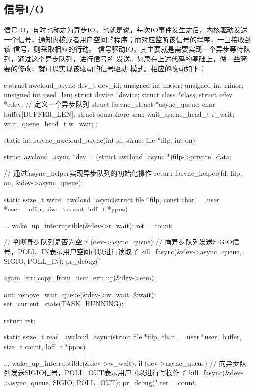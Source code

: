 \subsection{信号I/O}
信号IO，有时也称之为异步IO。也就是说，每次IO事件发生之后，内核驱动发送
一个信号，通知内核或者用户空间的程序；而对应监听该信号的程序，一旦接收到该
信号，则采取相应的行动。
信号驱动IO，其主要就是需要实现一个异步等待队列，通过这个异步队列，进行信号的
发送。如果在上述代码的基础上，做一些简要的修改，就可以实现该驱动的信号驱动
模式。相应的改动如下：
\begin{code-block}{c}
struct awcloud_async {
        dev_t                dev_id;
        unsigned int         major;
        unsigned int         minor;
        unsigned int         used_len;
        struct device        *device;
        struct class         *class;
        struct cdev          *cdev;
        // 定义一个异步队列
        struct fasync_struct *async_queue;
        char                 buffer[BUFFER_LEN];
        struct semaphore     sem;
        wait_queue_head_t    r_wait;
        wait_queue_head_t    w_wait;
};

static int fasync_awcloud_async(int fd, struct file *filp, int on)
{
        struct awcloud_async *dev = (struct awcloud_async *)filp->private_data;

        // 通过fasync_helper实现异步队列的初始化操作
        return fasync_helper(fd, filp, on, &dev->async_queue);
}

static ssize_t write_awcloud_async(struct file *filp,
        const char __user *user_buffer, size_t count, loff_t *ppos)
{
        ...
        wake_up_interruptible(&dev->r_wait);
        ret = count;

        // 判断异步队列是否为空
        if (dev->async_queue) {
                // 向异步队列发送SIGIO信号，POLL_IN表示用户空间可以进行读取了
                kill_fasync(&dev->async_queue, SIGIO, POLL_IN);
                pr_debug("%
        }

again_err:
copy_from_user_err:
        up(&dev->sem);

out:
        remove_wait_queue(&dev->w_wait, &wait);
        set_current_state(TASK_RUNNING);

        return ret;
}

static ssize_t read_awcloud_async(struct file *filp,
        char __user *user_buffer, size_t count, loff_t *ppos)
{
        ...
        wake_up_interruptible(&dev->w_wait);
        if (dev->async_queue) {
                // 向异步队列发送SIGIO信号，POLL_OUT表示用户可以进行写操作了
                kill_fasync(&dev->async_queue, SIGIO, POLL_OUT);
                pr_debug("%
        }
        ret = count;

}
\end{code-block}
